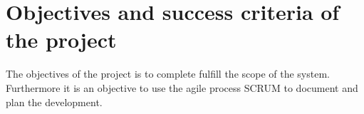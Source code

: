 \section{Objectives and success criteria of the project}
The objectives of the project is to complete fulfill the scope of the system. Furthermore it is an objective to use the agile process SCRUM to document and plan the development.
